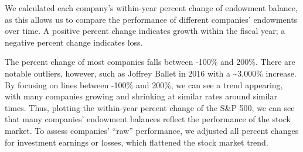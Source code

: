 \documentclass[Dance Data
Project,article,submit,moreauthors,pdftex]{mdpi}
\begin{document}
We calculated each company's within-year percent change of endowment
balance, as this allows us to compare the performance of different
companies' endowments over time. A positive percent change indicates
growth within the fiscal year; a negative percent change indicates loss.

The percent change of most companies falls between -100\% and 200\%.
There are notable outliers, however, such as Joffrey Ballet in 2016 with
a \textasciitilde3,000\% increase. By focusing on lines between -100\%
and 200\%, we can see a trend appearing, with many companies growing and
shrinking at similar rates around similar times. Thus, plotting the
within-year percent change of the S\&P 500, we can see that many
companies' endowment balances reflect the performance of the stock
market. To assess companies' ``raw'' performance, we adjusted all
percent changes for investment earnings or losses, which flattened the
stock market trend.

%

\vspace{6pt}




\end{document}

